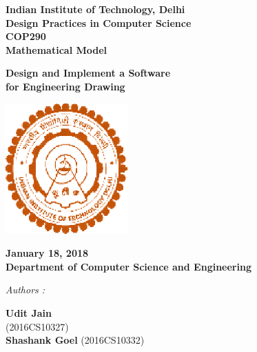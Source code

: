 \documentclass[12pt]{report}
\begin{document}
\begin{center}
\LARGE{\textbf{Indian Institute of Technology, Delhi}}\\
\vspace{1cm}
\large{\textbf{Design Practices in Computer Science}}\\[5pt]
\large{\textbf{COP290}}\\[5pt]
\large{\textbf{Mathematical Model}}\\[5pt]
\vspace{0.5cm}

\large{\textbf{Design and Implement a Software }}
\large{\textbf{\\for Engineering Drawing}}\\[5pt]




\begin{center}
\includegraphics[height=5cm]{iitd.eps}
\end{center}
\vspace{0.2cm}

\textbf{January 18, 2018} \\
\textbf{Department of Computer Science and Engineering} \\


\vspace{2cm}


\begin{multicols*}{2}

\begin{flushleft}

\textit{Authors :\\ }


\textbf{Udit Jain} \\
(2016CS10327)\\
\textbf{Shashank Goel}
(2016CS10332)\\


\end{flushleft}
\end{multicols*}
\end{center}
\end{document}
